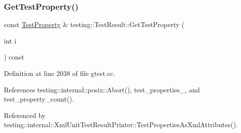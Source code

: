 \subsubsection{\texorpdfstring{Get\+Test\+Property()}{GetTestProperty()}}
{\footnotesize\ttfamily const \hyperlink{classtesting_1_1TestProperty}{Test\+Property} \& testing\+::\+Test\+Result\+::\+Get\+Test\+Property (\begin{DoxyParamCaption}\item[{int}]{i }\end{DoxyParamCaption}) const}



Definition at line 2038 of file gtest.\+cc.



References testing\+::internal\+::posix\+::\+Abort(), test\+\_\+properties\+\_\+, and test\+\_\+property\+\_\+count().



Referenced by testing\+::internal\+::\+Xml\+Unit\+Test\+Result\+Printer\+::\+Test\+Properties\+As\+Xml\+Attributes().


